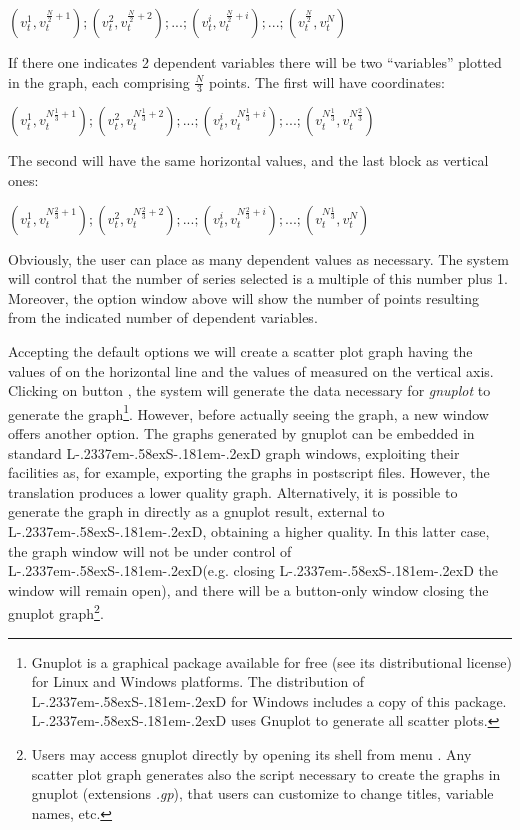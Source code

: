 \documentclass [11pt,a4paper] {book}
\def\LsD{{L\kern-.2337em\lower-.58ex\hbox{S}\kern-.181em\lower-.2ex\hbox{D}}\xspace}
\begin{document}
 $(v_t^1, v_t^{\frac{N}{2}+1}); (v_t^2, v_t^{\frac{N}{2}+2}); ...; (v_t^i, v_t^{\frac{N}{2}+i}); ...; (v_t^{\frac{N}{2}}, v_t^{N}) $
 
 If there one indicates 2 dependent variables there will be two ``variables'' plotted in the graph, each comprising $\frac{N}{3}$ points. The first will have coordinates:
 
 $(v_t^1, v_t^{N\frac{1}{3}+1}); (v_t^2, v_t^{N\frac{1}{3}+2}); ...; (v_t^i, v_t^{N\frac{1}{3}+i}); ...;
 (v_t^{N\frac{1}{3}}, v_t^{N\frac{2}{3}}) $
 
 The second will have the same horizontal values, and the last block as vertical ones:
 
 $(v_t^1, v_t^{N\frac{2}{3}+1}); (v_t^2, v_t^{N\frac{2}{3}+2}); ...; (v_t^i, v_t^{N\frac{2}{3}+i}); ...; (v_t^{N\frac{1}{3}}, v_t^{N}) $
 

Obviously, the user can place as many dependent values as necessary. The system will control that the number of series selected is a multiple of this number plus 1. Moreover, the option window above will show the number of points resulting from the indicated number of dependent variables.

Accepting the default options we will create a scatter plot graph having the values of  on the horizontal line and the values of  measured on the vertical axis. Clicking on button , the system will generate the data necessary for \textit{gnuplot} to generate the graph\footnote{Gnuplot is a graphical package available for free (see its distributional license) for Linux and Windows platforms. The distribution of \LsD for Windows includes a copy of this package. \LsD uses Gnuplot to generate all scatter plots.}. However, before actually seeing the graph, a new window offers another option. The graphs generated by gnuplot can be embedded in standard \LsD graph windows, exploiting their facilities as, for example, exporting the graphs in postscript files. However, the translation produces a lower quality graph. Alternatively, it is possible to generate the graph in directly as a gnuplot result, external to \LsD, obtaining a higher quality. In this latter case, the graph window will not be under control of \LsD (e.g. closing \LsD the window will remain open), and there will be a button-only window closing the gnuplot graph\footnote{Users may access gnuplot directly by opening its shell from menu . Any scatter plot graph generates also the script necessary to create the graphs in gnuplot (extensions \textit{.gp}), that users can customize to change titles, variable names, etc.}.
\end{document}
